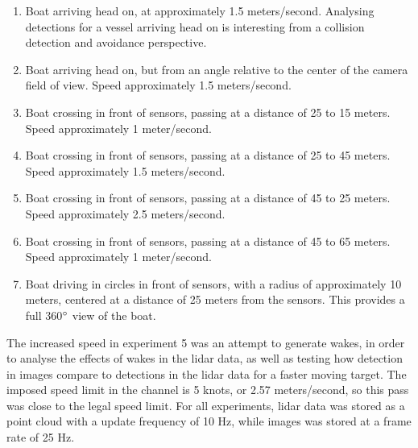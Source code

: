 \begin{enumerate}
	\item Boat arriving head on, at approximately 1.5 meters/second. Analysing detections for a vessel arriving head on is interesting from a collision detection and avoidance perspective.
	\item Boat arriving head on, but from an angle relative to the center of the camera field of view. Speed approximately 1.5 meters/second.
	\item Boat crossing in front of sensors, passing at a distance of 25 to 15 meters. Speed approximately 1 meter/second.
	\item Boat crossing in front of sensors, passing at a distance of 25 to 45 meters. Speed approximately 1.5 meters/second.
	\item Boat crossing in front of sensors, passing at a distance of 45 to 25 meters. Speed approximately 2.5 meters/second. 
	\item Boat crossing in front of sensors, passing at a distance of 45 to 65 meters. Speed approximately 1 meter/second.
	\item Boat driving in circles in front of sensors, with a radius of approximately 10 meters, centered at a distance of 25 meters from the sensors. This provides a full 360$\degree$ view of the boat.
\end{enumerate}
The increased speed in experiment 5 was an attempt to generate wakes, in order to analyse the effects of wakes in the lidar data, as well as testing how detection in images compare to detections in the lidar data for a faster moving target. The imposed speed limit in the channel is 5 knots, or 2.57 meters/second, so this pass was close to the legal speed limit. For all experiments, lidar data was stored as a point cloud with a update frequency of 10 Hz, while images was stored at a frame rate of 25 Hz.
\cleardoublepage